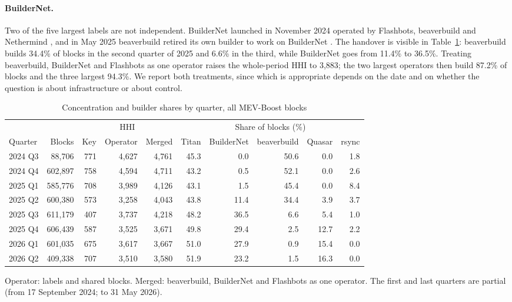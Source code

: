 \documentclass[11pt]{article}
\begin{document}
\paragraph{BuilderNet.} Two of the five largest labels are not independent.
BuilderNet launched in November 2024 operated by Flashbots, beaverbuild and
Nethermind \citep{buildernet2024}, and in May 2025 beaverbuild retired its
own builder to work on BuilderNet \citep{beaverbuild2025}. The handover is
visible in Table~\ref{tab:market}: beaverbuild builds 34.4\% of blocks in
the second quarter of 2025 and 6.6\% in the third, while BuilderNet goes
from 11.4\% to 36.5\%. Treating beaverbuild, BuilderNet and Flashbots as one
operator raises the whole-period HHI to 3,883; the two largest operators
then build 87.2\% of blocks and the three largest 94.3\%. We report both
treatments, since which is appropriate depends on the date and on whether
the question is about infrastructure or about control.

\begin{table}[!htbp]
\centering
\small
\caption{Concentration and builder shares by quarter, all MEV-Boost blocks}
\label{tab:market}
\begin{tabular}{lrrrrrrrrr}
\toprule
 & & \multicolumn{3}{c}{HHI} & \multicolumn{5}{c}{Share of blocks (\%)} \\
Quarter & Blocks & Key & Operator & Merged & Titan & BuilderNet & beaverbuild & Quasar & rsync \\
\midrule
2024 Q3 & 88{,}706 & 771 & 4{,}627 & 4{,}761 & 45.3 & 0.0 & 50.6 & 0.0 & 1.8 \\
2024 Q4 & 602{,}897 & 758 & 4{,}594 & 4{,}711 & 43.2 & 0.5 & 52.1 & 0.0 & 2.6 \\
2025 Q1 & 585{,}776 & 708 & 3{,}989 & 4{,}126 & 43.1 & 1.5 & 45.4 & 0.0 & 8.4 \\
2025 Q2 & 600{,}380 & 573 & 3{,}258 & 4{,}043 & 43.8 & 11.4 & 34.4 & 3.9 & 3.7 \\
2025 Q3 & 611{,}179 & 407 & 3{,}737 & 4{,}218 & 48.2 & 36.5 & 6.6 & 5.4 & 1.0 \\
2025 Q4 & 606{,}439 & 587 & 3{,}525 & 3{,}671 & 49.8 & 29.4 & 2.5 & 12.7 & 2.2 \\
2026 Q1 & 601{,}035 & 675 & 3{,}617 & 3{,}667 & 51.0 & 27.9 & 0.9 & 15.4 & 0.0 \\
2026 Q2 & 409{,}338 & 707 & 3{,}510 & 3{,}580 & 51.9 & 23.2 & 1.5 & 16.3 & 0.0 \\
\bottomrule
\end{tabular}

\vspace{0.5em}
\footnotesize Operator: labels and shared blocks. Merged: beaverbuild,
BuilderNet and Flashbots as one operator. The first and last quarters are
partial (from 17 September 2024; to 31 May 2026).
\end{table}
\end{document}
